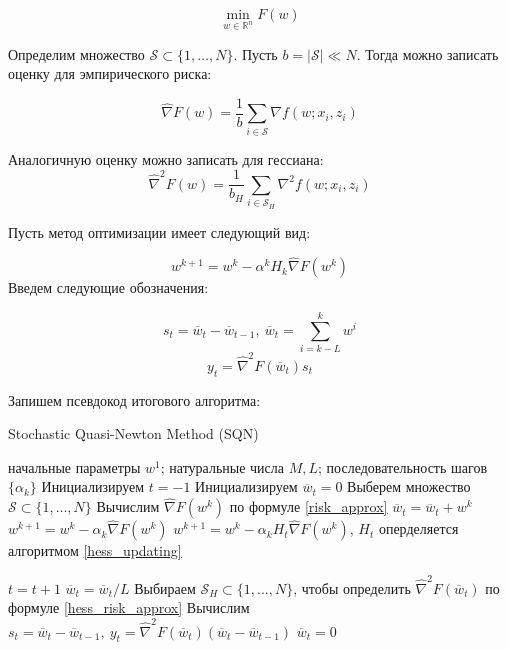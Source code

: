 \documentclass[]{scrartcl}
\begin{document}
\begin{equation}
\min_{w\in \mathbb{R}^n}F(w)
\end{equation}

Определим множество $\mathcal{S} \subset \{1, \ldots, N\}$. Пусть $b = |\mathcal{S}| \ll N$. Тогда можно записать оценку для эмпирического риска:

\begin{equation}
\label{risk_approx}
\widehat{\nabla}F(w) = \frac{1}{b}\sum_{i\in \mathcal{S}}\nabla f(w; x_i, z_i)
\end{equation}

Аналогичную оценку можно записать для гессиана:
\begin{equation}
\label{hess_risk_approx}
\widehat{\nabla}^2F(w) = \frac{1}{b_H}\sum_{i\in\mathcal{S}_H}\nabla^2f(w; x_i, z_i)
\end{equation}

Пусть метод оптимизации имеет следующий вид:

$$w^{k + 1} = w^k - \alpha^kH_k\widehat{\nabla}F(w^k)$$
Введем следующие обозначения:

$$s_t = \overline{w} _t- \overline{w}_{t-1}, ~ \overline{w}_t = \sum_{i = k-L}^kw^i$$
$$y_t = \widehat{\nabla}^2F(\overline{w}_t)s_t$$



Запишем псевдокод итогового алгоритма:

\begin{algorithm}[H]
	\caption{Stochastic Quasi-Newton Method (SQN)}
	\label{SQN}
	\begin{algorithmic}[1]
		\REQUIRE начальные параметры $w^1$; натуральные числа $M, L$; последовательность шагов $\{\alpha_k\}$
		\STATE Инициализируем $t = -1$
		\STATE Инициализируем $\overline{w}_t = 0$		
		\STATE Выберем множество $\mathcal{S} \subset\{1, \ldots, N\}$
		\STATE Вычислим $\widehat{\nabla}F(w^k)$ по формуле \ref{risk_approx}
		\STATE $\overline{w}_t = \overline{w}_t + w^k$
			\STATE $w^{k+1} = w^k - \alpha_k \widehat{\nabla}F(w^k)$
		\ELSE 
			\STATE $w^{k+1} = w^k - \alpha_kH_t\widehat{\nabla}F(w^k)$, $H_t$ оперделяется алгоритмом \ref{hess_updating}
		\ENDIF
		
			\STATE $t = t+1$
			\STATE $\overline{w}_t = \overline{w}_t / L$
				\STATE Выбираем $\mathcal{S}_H \subset \{1,\ldots,N\}$, чтобы определить $\widehat{\nabla}^2F(\overline{w}_t)$ по формуле \ref{hess_risk_approx}
				 \STATE Вычислим $s_t = \overline{w}_t - \overline{w}_{t-1}, ~y_t = \widehat{\nabla}^2F(\overline{w}_t)(\overline{w}_t - \overline{w}_{t-1})$ \label{st_yt}
			\ENDIF
			\STATE $\overline{w}_t = 0$
		\ENDIF
		\ENDFOR
	\end{algorithmic}
\end{algorithm}
\end{document}
